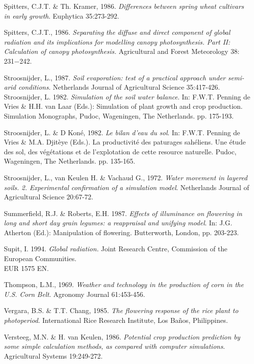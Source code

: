 Spitters, C.J.T. \& Th. Kramer, 1986. {\it Differences between spring wheat cultivars in early growth\/}.
Euphytica 35:273-292.

Spitters, C.J.T., 1986. {\it Separating the diffuse and direct component of global radiation and its
implications for modelling canopy photosynthesis. Part II: Calculation of canopy photosynthesis.\/}
Agricultural and Forest Meteorology 38: 231$-$242. 

Stroosnijder, L., 1987. {\it Soil evaporation: test of a practical approach under semi-arid conditions\/}.
Netherlands Journal of Agricultural Science 35:417-426.\\
 Stroosnijder, L. 1982. {\it Simulation of the soil water balance\/}. In: F.W.T. Penning de Vries \& H.H.
van Laar (Eds.): Simulation of plant growth and crop production. Simulation Monographs, Pudoc,
Wageningen, The Netherlands. pp. 175-193.

Stroosnijder, L. \& D Kon\'{e}, 1982. {\it Le bilan d'eau du sol\/}. In: F.W.T. Penning de Vries \& M.A.
Djit\`{e}ye (Eds.). La productivit\'{e} des paturages sah\'{e}liens. Une \'{e}tude des sol, des v\'{e}g\'{e}tations et de
l'explotation de cette resource naturelle. Pudoc, Wageningen, The Netherlands. pp. 135-165.

Stroosnijder, L., van Keulen H. \& Vachaud G., 1972. {\it Water movement in layered soils. 2.
Experimental confirmation of a simulation model\/}. Netherlands Journal of Agricultural Science 20:67-72.

Summerfield, R.J. \& Roberts, E.H. 1987. {\it Effects of illuminance on flowering in long and short day
grain legumes: a reappraisal and unifying model\/}. In: J.G. Atherton (Ed.): Manipulation of flowering.
Butterworth, London, pp. 203-223.

Supit, I. 1994. {\it Global radiation. \/}Joint Research Centre, Commission of the European Communities.\\
EUR 1575 EN.

Thompson, L.M., 1969. {\it Weather and technology in the production of corn in the U.S. Corn Belt\/}.
Agronomy Journal 61:453-456.

Vergara, B.S. \& T.T. Chang, 1985. {\it The flowering response of the rice plant to photoperiod\/}.
International Rice Research Institute, Los Ba\~{n}os, Philippines.

Versteeg, M.N. \& H. van Keulen, 1986. {\it Potential crop production prediction by some simple
calculation methods, as compared with computer simulations\/}. Agricultural Systems 19:249-272.

